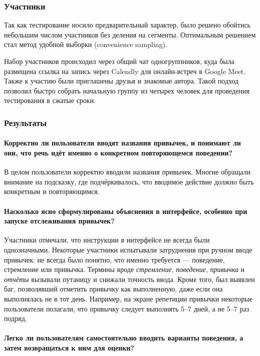 \documentclass[pdflatex,sn-mathphys-num]{sn-jnl}%
\theoremstyle{thmstyleone}%
\theoremstyle{thmstyletwo}%
\theoremstyle{thmstylethree}%
\begin{document}
\subsubsection{Участники}

Так как тестирование носило предварительный характер, было решено обойтись небольшим числом участников без деления на сегменты. Оптимальным решением стал метод удобной выборки (convenience sampling).

Набор участников происходил через общий чат одногруппников, куда была размещена ссылка на запись через Calendly для онлайн-встреч в Google Meet. Также к участию были приглашены друзья и знакомые автора. Такой подход позволил быстро собрать начальную группу из четырех человек для проведения тестирования в сжатые сроки.

\subsubsection{Результаты}

\paragraph{Корректно ли пользователи вводят названия привычек, и понимают ли они, что речь идёт именно о конкретном повторяющемся поведении?}

В целом пользователи корректно вводили названия привычек. Многие обращали внимание на подсказку, где подчёркивалось, что вводимое действие должно быть конкретным и повторяющимся. 

\paragraph{Насколько ясно сформулированы объяснения в интерфейсе, особенно при запуске отслеживания привычек?}

Участники отмечали, что инструкции в интерфейсе не всегда были однозначными. Некоторые участники испытывали затруднения при ручном вводе привычек: не всегда было понятно, что именно требуется — поведение, стремление или привычка. Термины вроде \textit{стремление}, \textit{поведение}, \textit{привычка} и \textit{отчёты} вызывали путаницу и снижали точность ввода. Кроме того, был выявлен баг, позволявший отметить привычку как выполненную, даже если она выполнялась не в тот день. Например, на экране репетиции привычки некоторые пользователи полагали, что привычку следует выполнять 5–7 дней, а не 5–7 раз подряд. 

\paragraph{Легко ли пользователям самостоятельно вводить варианты поведения, а затем возвращаться к ним для оценки?}
\end{document}
